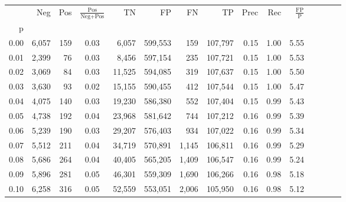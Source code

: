 \begin{tabular}{rrrcrrrrrrrrrrr}
\toprule
{} &     Neg &    Pos & $\frac{\text{Pos}}{\text{Neg}+\text{Pos}}$ &       TN &       FP &       FN &       TP &  Prec &   Rec & $\frac{\text{FP}}{\text{P}}$ \\
p    &         &        &                                            &          &          &          &          &       &       &                              \\
\midrule
0.00 &   6,057 &    159 &                                       0.03 &    6,057 &  599,553 &      159 &  107,797 &  0.15 &  1.00 &                         5.55 \\
0.01 &   2,399 &     76 &                                       0.03 &    8,456 &  597,154 &      235 &  107,721 &  0.15 &  1.00 &                         5.53 \\
0.02 &   3,069 &     84 &                                       0.03 &   11,525 &  594,085 &      319 &  107,637 &  0.15 &  1.00 &                         5.50 \\
0.03 &   3,630 &     93 &                                       0.02 &   15,155 &  590,455 &      412 &  107,544 &  0.15 &  1.00 &                         5.47 \\
0.04 &   4,075 &    140 &                                       0.03 &   19,230 &  586,380 &      552 &  107,404 &  0.15 &  0.99 &                         5.43 \\
0.05 &   4,738 &    192 &                                       0.04 &   23,968 &  581,642 &      744 &  107,212 &  0.16 &  0.99 &                         5.39 \\
0.06 &   5,239 &    190 &                                       0.03 &   29,207 &  576,403 &      934 &  107,022 &  0.16 &  0.99 &                         5.34 \\
0.07 &   5,512 &    211 &                                       0.04 &   34,719 &  570,891 &    1,145 &  106,811 &  0.16 &  0.99 &                         5.29 \\
0.08 &   5,686 &    264 &                                       0.04 &   40,405 &  565,205 &    1,409 &  106,547 &  0.16 &  0.99 &                         5.24 \\
0.09 &   5,896 &    281 &                                       0.05 &   46,301 &  559,309 &    1,690 &  106,266 &  0.16 &  0.98 &                         5.18 \\
0.10 &   6,258 &    316 &                                       0.05 &   52,559 &  553,051 &    2,006 &  105,950 &  0.16 &  0.98 &                         5.12 \\

\end{tabular}
